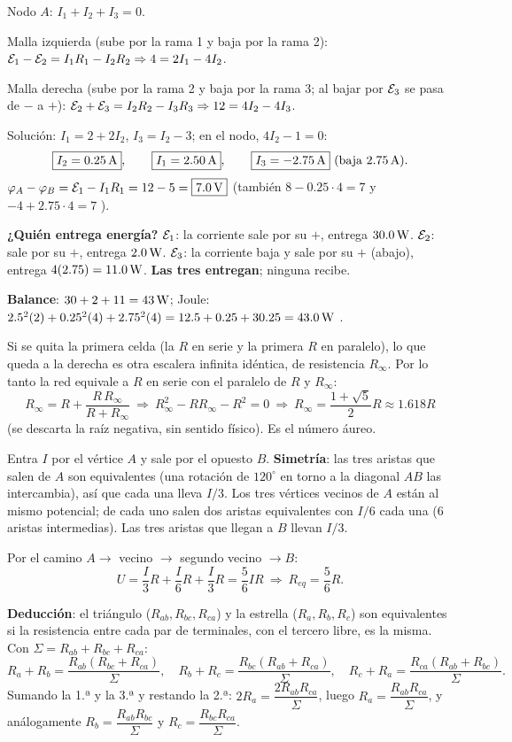 Nodo $A$: $I_1+I_2+I_3=0$.

Malla izquierda (sube por la rama 1 y baja por la rama 2): $\mathcal{E}_1-\mathcal{E}_2=I_1R_1-I_2R_2\Rightarrow4=2I_1-4I_2$.

Malla derecha (sube por la rama 2 y baja por la rama 3; al bajar por $\mathcal{E}_3$ se pasa de $-$ a $+$): $\mathcal{E}_2+\mathcal{E}_3=I_2R_2-I_3R_3\Rightarrow12=4I_2-4I_3$.

Solución: $I_1=2+2I_2$, $I_3=I_2-3$; en el nodo, $4I_2-1=0$:
\[
\boxed{I_2=0.25\,\mathrm{A}},\qquad\boxed{I_1=2.50\,\mathrm{A}},\qquad\boxed{I_3=-2.75\,\mathrm{A}}\ (\text{baja }2.75\,\mathrm{A}).
\]
$\varphi_A-\varphi_B=\mathcal{E}_1-I_1R_1=12-5=\boxed{7.0\,\mathrm{V}}$ (también $8-0.25\cdot4=7$ y $-4+2.75\cdot4=7$ \checkmark).

\textbf{¿Quién entrega energía?} $\mathcal{E}_1$: la corriente sale por su $+$, entrega $30.0\,\mathrm{W}$. $\mathcal{E}_2$: sale por su $+$, entrega $2.0\,\mathrm{W}$. $\mathcal{E}_3$: la corriente baja y sale por su $+$ (abajo), entrega $4(2.75)=11.0\,\mathrm{W}$. \textbf{Las tres entregan}; ninguna recibe.

\textbf{Balance}: $30+2+11=43\,\mathrm{W}$; Joule: $2.5^2(2)+0.25^2(4)+2.75^2(4)=12.5+0.25+30.25=43.0\,\mathrm{W}$ \checkmark.

\begin{center}\end{center}
Si se quita la primera celda (la $R$ en serie y la primera $R$ en paralelo), lo que queda a la derecha es otra escalera infinita idéntica, de resistencia $R_\infty$. Por lo tanto la red equivale a $R$ en serie con el paralelo de $R$ y $R_\infty$:
\[
R_\infty=R+\frac{R\,R_\infty}{R+R_\infty}\ \Rightarrow\ R_\infty^2-RR_\infty-R^2=0\ \Rightarrow\ \boxed{R_\infty=\frac{1+\sqrt5}{2}R\approx1.618R}
\]
(se descarta la raíz negativa, sin sentido físico). Es el número áureo.

Entra $I$ por el vértice $A$ y sale por el opuesto $B$. \textbf{Simetría}: las tres aristas que salen de $A$ son equivalentes (una rotación de $120^\circ$ en torno a la diagonal $AB$ las intercambia), así que cada una lleva $I/3$. Los tres vértices vecinos de $A$ están al mismo potencial; de cada uno salen dos aristas equivalentes con $I/6$ cada una (6 aristas intermedias). Las tres aristas que llegan a $B$ llevan $I/3$.

Por el camino $A\to$ vecino $\to$ segundo vecino $\to B$:
\[
U=\frac I3R+\frac I6R+\frac I3R=\frac56IR\ \Rightarrow\ \boxed{R_{eq}=\frac56R}.
\]

\textbf{Deducción}: el triángulo ($R_{ab},R_{bc},R_{ca}$) y la estrella ($R_a,R_b,R_c$) son equivalentes si la resistencia entre cada par de terminales, con el tercero libre, es la misma. Con $\Sigma=R_{ab}+R_{bc}+R_{ca}$:
\[
R_a+R_b=\frac{R_{ab}(R_{bc}+R_{ca})}{\Sigma},\quad R_b+R_c=\frac{R_{bc}(R_{ab}+R_{ca})}{\Sigma},\quad R_c+R_a=\frac{R_{ca}(R_{ab}+R_{bc})}{\Sigma}.
\]
Sumando la 1.ª y la 3.ª y restando la 2.ª: $2R_a=\dfrac{2R_{ab}R_{ca}}{\Sigma}$, luego $\boxed{R_a=\dfrac{R_{ab}R_{ca}}{\Sigma}}$, y análogamente $R_b=\dfrac{R_{ab}R_{bc}}{\Sigma}$ y $R_c=\dfrac{R_{bc}R_{ca}}{\Sigma}$.

